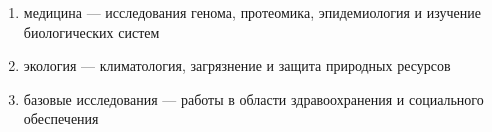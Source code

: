 \documentclass[och, referat]{SCWorks}
\begin{document}
\begin{enumerate} 

\item медицина — исследования генома, протеомика, эпидемиология и изучение биологических систем
\item экология — климатология, загрязнение и защита природных ресурсов
\item базовые исследования — работы в области здравоохранения и социального обеспечения
\end{enumerate}




\end{document}
